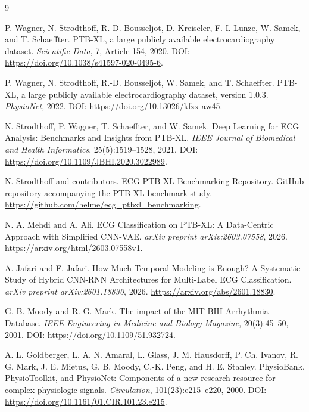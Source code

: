 \documentclass[11pt,a4paper]{article}
\begin{document}
\begin{thebibliography}{9}

P. Wagner, N. Strodthoff, R.-D. Bousseljot, D. Kreiseler, F. I. Lunze, W. Samek, and T. Schaeffter.
\newblock PTB-XL, a large publicly available electrocardiography dataset.
\newblock \emph{Scientific Data}, 7, Article 154, 2020.
\newblock DOI: \url{https://doi.org/10.1038/s41597-020-0495-6}.

P. Wagner, N. Strodthoff, R.-D. Bousseljot, W. Samek, and T. Schaeffter.
\newblock PTB-XL, a large publicly available electrocardiography dataset, version 1.0.3.
\newblock \emph{PhysioNet}, 2022.
\newblock DOI: \url{https://doi.org/10.13026/kfzx-aw45}.

N. Strodthoff, P. Wagner, T. Schaeffter, and W. Samek.
\newblock Deep Learning for ECG Analysis: Benchmarks and Insights from PTB-XL.
\newblock \emph{IEEE Journal of Biomedical and Health Informatics}, 25(5):1519--1528, 2021.
\newblock DOI: \url{https://doi.org/10.1109/JBHI.2020.3022989}.

N. Strodthoff and contributors.
\newblock ECG PTB-XL Benchmarking Repository.
\newblock GitHub repository accompanying the PTB-XL benchmark study.
\newblock \url{https://github.com/helme/ecg_ptbxl_benchmarking}.

N. A. Mehdi and A. Ali.
\newblock ECG Classification on PTB-XL: A Data-Centric Approach with Simplified CNN-VAE.
\newblock \emph{arXiv preprint arXiv:2603.07558}, 2026.
\newblock \url{https://arxiv.org/html/2603.07558v1}.

A. Jafari and F. Jafari.
\newblock How Much Temporal Modeling is Enough? A Systematic Study of Hybrid CNN-RNN Architectures for Multi-Label ECG Classification.
\newblock \emph{arXiv preprint arXiv:2601.18830}, 2026.
\newblock \url{https://arxiv.org/abs/2601.18830}.

G. B. Moody and R. G. Mark.
\newblock The impact of the MIT-BIH Arrhythmia Database.
\newblock \emph{IEEE Engineering in Medicine and Biology Magazine}, 20(3):45--50, 2001.
\newblock DOI: \url{https://doi.org/10.1109/51.932724}.

A. L. Goldberger, L. A. N. Amaral, L. Glass, J. M. Hausdorff, P. Ch. Ivanov, R. G. Mark, J. E. Mietus, G. B. Moody, C.-K. Peng, and H. E. Stanley.
\newblock PhysioBank, PhysioToolkit, and PhysioNet: Components of a new research resource for complex physiologic signals.
\newblock \emph{Circulation}, 101(23):e215--e220, 2000.
\newblock DOI: \url{https://doi.org/10.1161/01.CIR.101.23.e215}.

\end{thebibliography}
\end{document}
